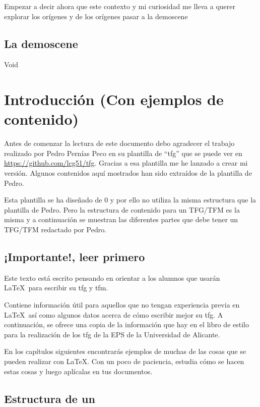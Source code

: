 Empezar a decir ahora que este contexto y mi curiosidad me lleva a querer explorar los orígenes y de los orígenes pasar a la demoscene

\section{La demoscene}

Void


\chapter{Introducción (Con ejemplos de contenido)}

Antes de comenzar la lectura de este documento debo agradecer el trabajo realizado por Pedro Pernías Peco en su plantilla de ``tfg'' que se puede ver en \url{https://github.com/lcg51/tfg}. Gracias a esa plantilla me he lanzado a crear mi versión. Algunos contenidos aquí mostrados han sido extraídos de la plantilla de Pedro. 
\\
\par Esta plantilla se ha diseñado de 0 y por ello no utiliza la misma estructura que la plantilla de Pedro. Pero la estructura de contenido para un TFG/TFM es la misma y a continuación se muestran las diferentes partes que debe tener un TFG/TFM redactado por Pedro.
\section{¡Importante!, leer primero}

Este texto está escrito pensando en orientar a los alumnos que usarán \LaTeX~para escribir su \gls{tfg} y \gls{tfm}. 
\\
\par Contiene información útil para aquellos que no tengan experiencia previa en \LaTeX~así como algunos datos acerca de cómo escribir mejor su \gls{tfg}.
A continuación, se ofrece una copia de la información que hay en el libro de estilo para la realización de los \gls{tfg} de la EPS de la Universidad de Alicante.

En los capítulos siguientes encontrarás ejemplos de muchas de las cosas que se pueden realizar con \LaTeX. Con un poco de paciencia, estudia cómo se hacen estas cosas y luego aplícalas en tus documentos.


\section{Estructura de un }

